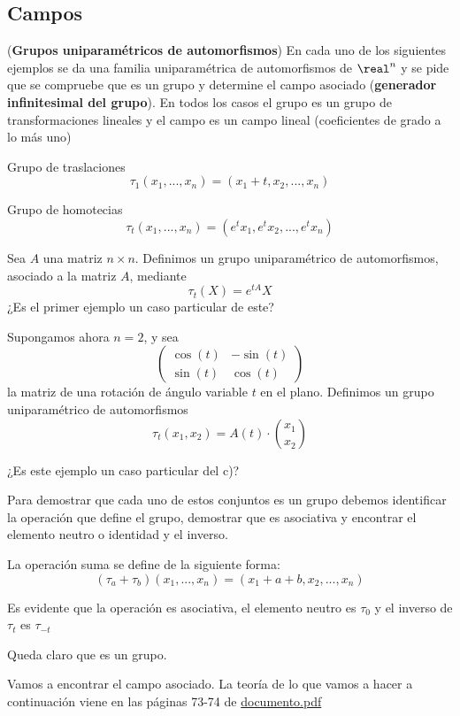 \subsection{Campos}
\begin{problem}[1]
(\textbf{Grupos uniparamétricos de automorfismos}) En cada uno de los siguientes ejemplos se da una familia uniparamétrica de automorfismos de $\real^n$ y se pide que se compruebe que es un grupo y determine el campo asociado (\textbf{generador infinitesimal del grupo}). En todos los casos el grupo es un grupo de transformaciones lineales y el campo es un campo lineal (coeficientes de grado a lo más uno)

\ppart Grupo de traslaciones
\[τ_1(x_1,...,x_n)=(x_1+t,x_2,...,x_n)\]

\ppart Grupo de homotecias
\[τ_t(x_1,...,x_n)=(e^tx_1, e^tx_2,...,e^tx_n)\]

\ppart Sea $A$ una matriz $n\times n$. Definimos un grupo uniparamétrico de automorfismos, asociado a la matriz $A$, mediante
\[τ_t(X)=e^{tA}X\]
¿Es el primer ejemplo un caso particular de este?

\ppart
Supongamos ahora $n=2$, y sea
\[ \left( \begin{array}{cc}

\cos(t) & -\sin(t) \\
\sin(t) & \cos(t)

\end{array} \right)\]
la matriz de una rotación de ángulo variable $t$ en el plano. Definimos un grupo uniparamétrico de automorfismos
\[τ_t(x_1,x_2)=A(t)\cdot {x_1 \choose x_2}\]

¿Es este ejemplo un caso particular del c)?

\solution
\yoP

Para demostrar que cada uno de estos conjuntos es un grupo debemos identificar la operación que define el grupo, demostrar que es asociativa y encontrar el elemento neutro o identidad y el inverso.

\spart
La operación suma se define de la siguiente forma:
\[(τ_a+τ_b)(x_1,...,x_n)=(x_1+a+b,x_2,...,x_n)\]

Es evidente que la operación es asociativa, el elemento neutro es $τ_0$ y el inverso de $τ_t$ es $τ_{-t}$

Queda claro que es un grupo.

Vamos a encontrar el campo asociado. La teoría de lo que vamos a hacer a continuación viene en las páginas 73-74 de \href{http://matematicas.unex.es/~ricarfr/EcDiferenciales/LibroEDLat.pdf}{documento.pdf}


\end{problem}
